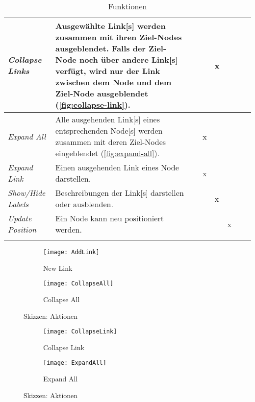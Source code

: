 \begin{longtable}{|P{2cm}|P{5cm}||p{0.3cm}|p{0.3cm}|p{0.3cm}|p{0.3cm}|p{0.3cm}|p{0.3cm}|}
    \textit{Collapse Links} & Ausgewählte \gls{Link}[s] werden zusammen mit ihren Ziel-Nodes ausgeblendet. Falls der Ziel-Node noch über andere \gls{Link}[s] verfügt, wird nur der \gls{Link} zwischen dem \gls{Node} und dem Ziel-Node ausgeblendet (\autoref{fig:collapse-link}). &&&x&&& \\\hline
    \textit{Expand All} & Alle ausgehenden \gls{Link}[s] eines entsprechenden \gls{Node}[s] werden zusammen mit deren Ziel-Nodes eingeblendet (\autoref{fig:expand-all}). &&x&&&& \\\hline
    \textit{Expand Link} & Einen ausgehenden \gls{Link} eines \gls{Node} darstellen. &&x&&&& \\\hline
    \textit{Show/Hide Labels} & Beschreibungen der \gls{Link}[s] darstellen oder ausblenden. &&&x&&& \\\hline
    \textit{Update Position} & Ein \gls{Node} kann neu positioniert werden. &&&&x&& \\\hline
    \caption{Funktionen}
  \label{tab:funktionen}
\end{longtable}



\begin{figure}[htbp]
\centering
    \begin{subfigure}[b]{0.5\textwidth}
    \texttt{[image: AddLink]}
    \caption{New Link}
    \label{fig:add-link}
    \end{subfigure}
    \begin{subfigure}[b]{0.4\textwidth}
    \texttt{[image: CollapseAll]}
    \caption{Collapse All}
    \label{fig:collapse-all}
    \end{subfigure}
    \caption{Skizzen: Aktionen}
\end{figure}

\begin{figure}[htbp]
\centering
    \begin{subfigure}[b]{0.4\textwidth}
    \texttt{[image: CollapseLink]}
    \caption{Collapse Link}
    \label{fig:collapse-link}
    \end{subfigure}
    \begin{subfigure}[b]{0.5\textwidth}
    \texttt{[image: ExpandAll]}
    \caption{Expand All}
    \label{fig:expand-all}
    \end{subfigure}
    \caption{Skizzen: Aktionen}
\end{figure}


